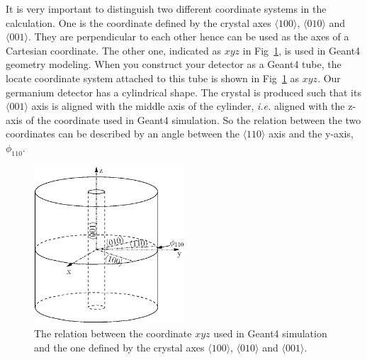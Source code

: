 It is very important to distinguish two different coordinate systems in the calculation. One is the coordinate defined by the crystal axes $\langle100\rangle$, $\langle010\rangle$ and $\langle001\rangle$. They are perpendicular to each other hence can be used as the axes of a Cartesian coordinate. The other one, indicated as $xyz$ in Fig~\ref{fig:pss:coo}, is used in Geant4 geometry modeling. When you construct your detector as a Geant4 tube, the locate coordinate system attached to this tube is shown in Fig~\ref{fig:pss:coo} as $xyz$. Our germanium detector has a cylindrical shape. The crystal is produced such that its $\langle001\rangle$ axis is aligned with the middle axis of the cylinder, \textit{i.e.} aligned with the z-axis of the coordinate used in Geant4 simulation. So the relation between the two coordinates can be described by an angle between the $\langle110\rangle$ axis and the y-axis, $\phi_{110}$.
\begin{figure}[htpb]
  \centering
  \includegraphics[width=0.5\textwidth]{coordins}  
  \caption{The relation between the coordinate $xyz$ used in Geant4     simulation and the one defined by the crystal axes     $\langle100\rangle$, $\langle010\rangle$ and $\langle001\rangle$.}
  \label{fig:pss:coo}
\end{figure}

